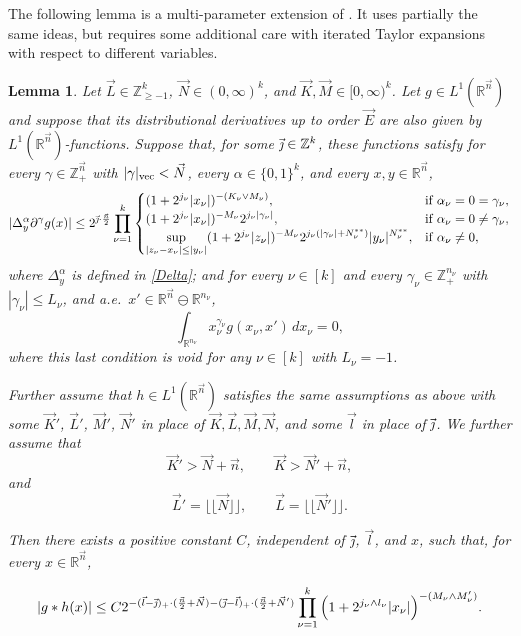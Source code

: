 \documentclass[11pt, reqno]{amsart}
\newtheorem{lemma}[theorem]{Lemma}
\theoremstyle{definition}
\theoremstyle{remark}
\numberwithin{equation}{section}
\newcommand{\R}{\mathbb R}
\newcommand{\Z}{\mathbb Z}
\newcommand{\vj}{\vec{\textit{\j}}}
\newcommand{\vn}{\vec n}
\newcommand{\vl}{\vec l}
\newcommand{\abs}[1]{|#1|}
\begin{document}
The following lemma is a multi-parameter extension of  \cite[Lemma B.1]{FJ90}. It uses partially the same ideas, but requires some additional care with iterated Taylor expansions with respect to different variables.

\begin{lemma}\label{fj B1}
Let $\vec L\in\Z_{\geq-1}^k$, $\vec N\in(0,\infty)^k$, and $\vec K,\vec M\in[0,\infty)^k$.
Let $g\in L^1(\R^{\vn})$ and suppose that its distributional derivatives up to order $\vec E$ are also given by $L^1(\R^{\vn})$-functions.
Suppose that, for some $\vj\in\Z^k$, these functions satisfy
for every $\gamma\in\mathbb Z_+^{\vec n}$
with $|\gamma|_{\rm{vec}}<\vec N$, every $\alpha\in\{0,1\}^k$,
and every $x,y\in\mathbb{R}^{\vn}$,
\begin{equation}\label{g11}
  \abs{\Delta_y^\alpha\partial^\gamma g(x)}
  \leq   2^{{\vj\cdot\frac{\vn}{2}}}
  \prod_{\nu=1}^k  \begin{cases} \displaystyle
   (1+2^{j_\nu}\abs{x_\nu})^{-(K_{\nu}\vee M_{\nu})}, &\text{if }\alpha_\nu=0=\gamma_\nu, \\
   \displaystyle
  (1+2^{j_\nu}\abs{x_\nu})^{-M_{\nu}}2^{j_\nu \abs{\gamma_\nu}},
  & \text{if }\alpha_\nu=0\neq \gamma_\nu, \\
  \displaystyle
  \sup_{\abs{z_\nu-x_\nu}\leq\abs{y_\nu}} (1+2^{j_\nu}\abs{z_\nu})^{-M_{\nu}}2^{j_\nu(\abs{\gamma_\nu}+{N_\nu^{**}})}\abs{y_\nu}^{N_\nu^{**}},
  & \text{if }\alpha_\nu\neq 0,
\end{cases}
\end{equation}
where $\Delta_y^\alpha$ is defined in \eqref{Delta}; and
for every $\nu\in[k]$ and every $\gamma_\nu\in\mathbb Z_+^{n_\nu}$
with $|\gamma_\nu|\leq L_\nu$,
and a.e.\ $x'\in\R^{\vn}\ominus\R^{n_{\nu}}$,
\begin{equation}\label{h2}
   \int_{\mathbb R^{n_\nu}}x_\nu^{\gamma_\nu} g(x_\nu,x')\,dx_\nu=0,
\end{equation}
where this last condition is void for any $\nu\in[k]$ with $L_\nu=-1$.

Further assume that $h\in L^1(\R^{\vn})$ satisfies the same assumptions as above with some $\vec K'$, $\vec L'$, $\vec M'$, $\vec N'$ in place of $\vec K,\vec L,\vec M,\vec N$, and some $\vec l$ in place of $\vj$. We further assume that
\begin{equation}\label{eq:K>N+n}
  \vec K'>\vec N+\vn,\qquad
  \vec K>\vec N'+\vn,
\end{equation}
and
\begin{equation}\label{eq:L=N-1}
  \vec L'=\lfloor\!\lfloor \vec N\rfloor\!\rfloor,\qquad
  \vec L=\lfloor\!\lfloor \vec N'\rfloor\!\rfloor.
\end{equation}

Then there exists a positive constant $C$,
independent of $\vj$, $\vl$, and $x$, such that, for every $x\in\mathbb{R}^{\vn}$,

\begin{equation}\label{eq:g*h1}
|g*h(x)|\leq
C 2^{-(\vl-\vj)_+\cdot(\frac{\vn}{2}+\vec N)-(\vj-\vl)_+\cdot(\frac{\vn}{2}+\vec N')}
\prod_{\nu=1}^{k}\Big(1+2^{j_\nu \wedge l_\nu}|x_\nu|\Big)^{-(M_\nu\wedge M_\nu')}.
\end{equation}
\end{lemma}
\end{document}
